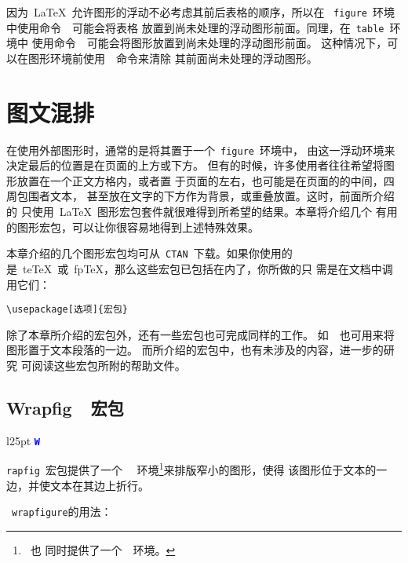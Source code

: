 因为~\LaTeX{}~允许图形的浮动不必考虑其前后表格的顺序，所以在
~\texttt{figure}~环境中使用命令~~可能会将表格
放置到尚未处理的浮动图形前面。同理，在~\texttt{table}~环境中
使用命令~~可能会将图形放置到尚未处理的浮动图形前面。
这种情况下，可以在图形环境前使用~~命令来清除
其前面尚未处理的浮动图形。

\section{图文混排}

在使用外部图形时，通常的是将其置于一个~\texttt{figure}~环境中，
由这一浮动环境来决定最后的位置是在页面的上方或下方。
但有的时候，许多使用者往往希望将图形放置在一个正文方格内，或者置
于页面的左右，也可能是在页面的的中间，四周包围者文本，
甚至放在文字的下方作为背景，或重叠放置。这时，前面所介绍的
只使用~\LaTeX{}~图形宏包套件就很难得到所希望的结果。本章将介绍几个
有用的图形宏包，可以让你很容易地得到上述特殊效果。

本章介绍的几个图形宏包均可从~\texttt{CTAN}~下载。如果你使用的
是~te\TeX{}~或~fp\TeX{}，那么这些宏包已包括在内了，你所做的只
需是在文档中调用它们：
\begin{Verbatim}[xleftmargin=1cm]
\usepackage[选项]{宏包}
\end{Verbatim}
除了本章所介绍的宏包外，还有一些宏包也可完成同样的工作。
如~~也可用来将图形置于文本段落的一边。
而所介绍的宏包中，也有未涉及的内容，进一步的研究
可阅读这些宏包所附的帮助文件。

\subsection{Wrapfig~~宏包}\label{ssec:wrapfig}

\intextsep=0pt
\begin{wrapfigure}{l}{25pt}
	\textcolor{blue}{\mbox{\bfseries\texttt{\PartSize W}}}
\end{wrapfigure} \noindent \texttt{rapfig}~宏包提供了一个
~~环境\footnote{~也
	同时提供了一个~~环境。}来排版窄小的图形，使得
该图形位于文本的一边，并使文本在其边上折行。

~\texttt{wrapfigure}的用法：


